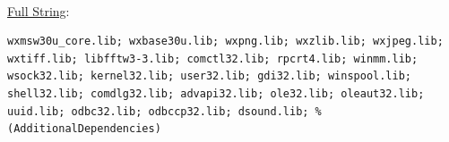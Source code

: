 \documentclass[12pt]{report}
\begin{document}
\begin{appendices}
\begin{itemize}
\begin{itemize}
\begin{itemize}
\begin{itemize}
						\\
						\underline{\scriptsize Full String}:
\begin{lstlisting}
wxmsw30u_core.lib; wxbase30u.lib; wxpng.lib; wxzlib.lib; wxjpeg.lib; wxtiff.lib; libfftw3-3.lib; comctl32.lib; rpcrt4.lib; winmm.lib; wsock32.lib; kernel32.lib; user32.lib; gdi32.lib; winspool.lib; shell32.lib; comdlg32.lib; advapi32.lib; ole32.lib; oleaut32.lib; uuid.lib; odbc32.lib; odbccp32.lib; dsound.lib; %(AdditionalDependencies)
\end{lstlisting}
				\end{itemize}  %
			\end{itemize}  %

		\end{itemize} %
	\end{itemize} %
	\clearpage
\end{appendices}
\end{document}
